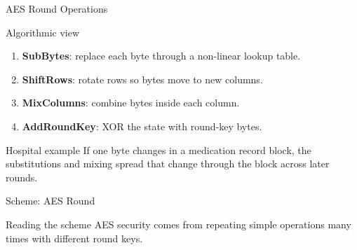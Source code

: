 \documentclass[presentation]{beamer}
\begin{document}
\begin{frame}[c]{AES Round Operations}
\begin{block}{Algorithmic view}
\begin{enumerate}
    \item \textbf{SubBytes}: replace each byte through a non-linear lookup table.
    \item \textbf{ShiftRows}: rotate rows so bytes move to new columns.
    \item \textbf{MixColumns}: combine bytes inside each column.
    \item \textbf{AddRoundKey}: XOR the state with round-key bytes.
\end{enumerate}
\end{block}

\begin{exampleblock}{Hospital example}
If one byte changes in a medication record block, the substitutions and mixing spread that change
through the block across later rounds.
\end{exampleblock}
\end{frame}

\begin{frame}[c]{Scheme: AES Round}
\begin{center}
\end{center}

\begin{block}{Reading the scheme}
AES security comes from repeating simple operations many times with different round keys.
\end{block}
\end{frame}
\end{document}
